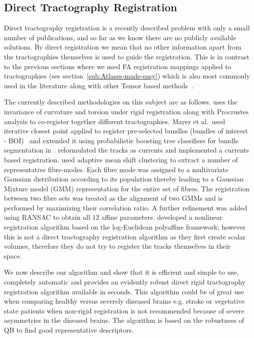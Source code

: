 \documentclass[preprint,authoryear,a4paper,10pt,onecolumn]{elsarticle}
\begin{document}

\subsection{Direct Tractography Registration}

Direct tractography registration is a recently described problem with
only a small number of publications, and so far as we know there are no
publicly available solutions. By direct registration we mean that no
other information apart from the tractographies themselves is used to
guide the registration. This is in contrast to the previous sections
where we used FA registration mappings applied to tractographies (see
section~\ref{sub:Atlases-made-easy}) which is also most commonly used in
the literature along with other Tensor based
methods~\citep{goh2006algebraic}.

The currently described methodologies on this subject are as follows.
\citet{leemans2006multiscale} uses the invariance of
curvature and torsion under rigid registration along with Procrustes
analysis to co-register together different tractographies. Mayer et
al.~used iterative closest point applied to register pre-selected
bundles (bundles of interest - BOI)~\citep{mayer2008bundles,mayerdirect} and extended it using probabilistic boosting tree
classifiers for bundle segmentation
in \citep{mayer2011supervised}. \citet{durrleman2010registration} reformulated the tracks as currents
and implemented a currents based registration. \citep{zvitia2008adaptive,Zvitia2010} used adaptive mean
shift clustering to extract a number of representative
fi{}bre-modes. Each fibre mode was assigned to a multivariate Gaussian
distribution according to its population thereby leading to a Gaussian
Mixture model (GMM) representation for the entire set of fibres. The
registration between two fibre sets was treated as the alignment of two
GMMs and is performed by maximizing their correlation ratio. A further
refinement was added using RANSAC \citep{fischler1981random} to obtain all
$12$ affine parameters. \citet{ZiyanMICCAI07} developed a
nonlinear registration algorithm based on the log-Euclidean polyaffine
framework\citep{Arsigny2009}; however this is not a direct tractography
registration algorithm as they first create scalar volumes, therefore
they do not try to register the tracks themselves in their space.

We now describe our algorithm and show that it is efficient and simple
to use, completely automatic and provides an evidently robust direct
rigid tractography registration algorithm available in seconds. This
algorithm could be of great use when comparing healthy versus severely
diseased brains e.g. stroke or vegetative state patients when non-rigid
registration is not recommended because of severe asymmetries in the
diseased brains. The algorithm is based on the robustness of QB to find
good representative descriptors.
\end{document}
